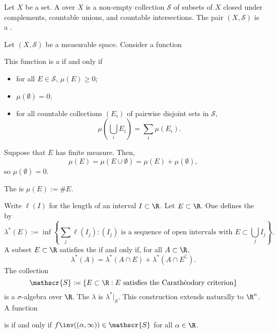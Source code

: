 \documentclass [preview, border = 20pt] {standalone}
\begin{document}
\pagecolor{black}
\color{white}
Let $X$ be a set. A  over $X$ is a non-empty collection $\mathscr{S}$ of subsets of $X$ closed under complements, countable unions, and countable intersections. The pair $(X,\mathscr{S})$ is a .

Let $(X, \mathscr{S})$ be a measurable space. Consider a function
\begin{center}
\end{center}
This function is a  if and only if
\begin{itemize}[label = ------, leftmargin = *]
\item for all $E\in \mathscr{S}$, $\mu(E)\ge 0$;
\item $\mu(\emptyset)=0$;
\item for all countable collections $(E_i)$ of pairwise disjoint sets in $\mathscr{S}$,
\[
  \mu\left(\bigcup_i E_i\right) = \sum_i\mu(E_i).
\]
\end{itemize}

Suppose that $E$ has finite measure. Then,
\[
 \mu(E) = \mu(E\cup\emptyset) = \mu(E) + \mu(\emptyset),
\]
so $\mu(\emptyset) = 0$.

The  is $\mu(E) := \# E$.

Write $\ell(I)$ for the length of an interval $I\subset\R$. Let $E\subset \R$. One defines the  by
\[
 \lambda^*(E) := \inf\left\{ \sum_j \ell(I_j) : \textrm{$(I_j)$ is a sequence of open intervals with $E\subset \bigcup_j I_j$}\right\}.
\]
A subset $E\subset \R$ satisfies the  if and only if, for all $A\subset \R$,
\[
\lambda^*(A) = \lambda^*(A\cap E) + \lambda^*(A\cap E^\complement).
\]
The collection
\[
\mathscr{S} := \{ E\subset \R: \textrm{$E$ satisfies the {Carath\'eodory criterion}}\}
\]
is a $\sigma$-algebra over $\R$. The  $\lambda$ is $\lambda^*\big |_{\mathscr{S}}$. This construction extends naturally to $\R^n$. A function
\begin{center}
\end{center}
is  if and only if $f\inv((\alpha,\infty)) \in \mathscr{S}$ for all $\alpha\in \R$.
\end{document}
